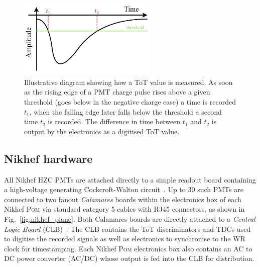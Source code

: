 \begin{figure} %
    \includegraphics[width=0.6\textwidth]{diagrams/5-daq/tot.pdf}
    \caption[Illustrative diagram showing how Time over Threshold is measured]
    {Illustrative diagram showing how a ToT value is measured. As soon as the rising edge of a PMT
        charge pulse rises above a given threshold (goes below in the negative charge case) a time
        is recorded $t_{1}$, when the falling edge later falls below the threshold a second time
        $t_{2}$ is recorded. The difference in time between $t_{1}$ and $t_{2}$ is output by the
        electronics as a digitised ToT value.}
    \label{fig:tot}
\end{figure}

\subsection{Nikhef hardware} %
\label{sec:daq_hard_Nikhed} %

All Nikhef HZC PMTs are attached directly to a simple readout board containing a high-voltage
generating Cockcroft-Walton circuit~\cite{cockcroft1932}. Up to 30 such PMTs are connected to two
fanout \emph{Calamares} boards within the electronics box of each Nikhef \textsc{Pom} via standard
category 5 cables with RJ45 connectors, as shown in Fig.~\ref{fig:nikhef_plane}. Both Calamares
boards are directly attached to a \emph{Central Logic Board} (CLB)~\cite{biagi2015, eijk2015}. The
CLB contains the ToT discriminators and TDCs used to digitise the recorded signals as well as
electronics to synchronise to the WR clock for timestamping. Each Nikhef \textsc{Pom} electronics
box also contains an AC to DC power converter (AC/DC) whose output is fed into the CLB for
distribution.

